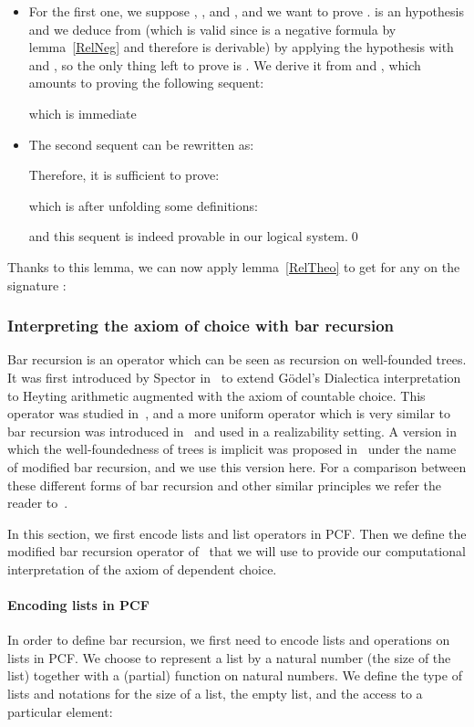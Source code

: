 \documentclass{CSML}
\begin{document}
\begin{itemize}
\item For the first one, we suppose , ,  and , and we want to prove .  is an hypothesis and we deduce  from  (which is valid since  is a negative formula by lemma~\ref{RelNeg} and therefore  is derivable) by applying the hypothesis  with  and , so the only thing left to prove is . We derive it from  and , which amounts to proving the following sequent:

which is immediate
\item The second sequent can be rewritten as:

Therefore, it is sufficient to prove:

which is after unfolding some definitions:

and this sequent is indeed provable in our logical system.\qed\end{itemize}
Thanks to this lemma, we can now apply lemma~\ref{RelTheo} to get for any  on the signature :

\subsubsection{Interpreting the axiom of choice with bar recursion}
\label{barrecursion}
Bar recursion is an operator which can be seen as recursion on well-founded trees. It was first introduced by Spector in~\cite{Spector} to extend G\"odel's Dialectica interpretation to Heyting arithmetic augmented with the axiom of countable choice. This operator was studied in~\cite{KohlenbachThesis}, and a more uniform operator which is very similar to bar recursion was introduced in~\cite{BerardiBezemCoquand} and used in a realizability setting. A version in which the well-foundedness of trees is implicit was proposed in~\cite{BergerOlivaChoice} under the name of modified bar recursion, and we use this version here. For a comparison between these different forms of bar recursion and other similar principles we refer the reader to~\cite{PowellThesis,PowellEquivalence}.\par
In this section, we first encode lists and list operators in PCF. Then we define the modified bar recursion operator of~\cite{BergerOlivaChoice} that we will use to provide our computational interpretation of the axiom of dependent choice.
\paragraph{Encoding lists in PCF}
In order to define bar recursion, we first need to encode lists and operations on lists in PCF. We choose to represent a list by a natural number (the size of the list) together with a (partial) function on natural numbers. We define the type of lists and notations for the size of a list, the empty list, and the access to a particular element:
\end{document}
